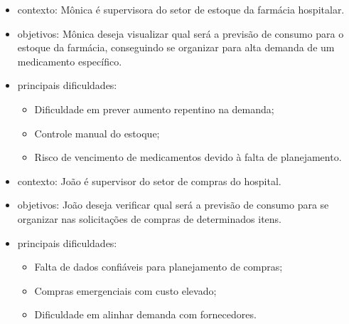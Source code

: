 \documentclass[12pt,a4paper]{article}
\begin{document}
\begin{itemize}
    \item contexto: Mônica é supervisora do setor de estoque da farmácia hospitalar.
    \item objetivos: Mônica deseja visualizar qual será a previsão de consumo para o estoque da farmácia, conseguindo se organizar para alta demanda de um medicamento específico.
    \item principais dificuldades:
    \begin{itemize}
        \item Dificuldade em prever aumento repentino na demanda;
        \item Controle manual do estoque;
        \item Risco de vencimento de medicamentos devido à falta de planejamento.
    \end{itemize}
\end{itemize}

\begin{itemize}
    \item contexto: João é supervisor do setor de compras do hospital.
    \item objetivos: João deseja verificar qual será a previsão de consumo para se organizar nas solicitações de compras de determinados itens.
    \item principais dificuldades:
    \begin{itemize}
        \item Falta de dados confiáveis para planejamento de compras;
        \item Compras emergenciais com custo elevado;
        \item Dificuldade em alinhar demanda com fornecedores.
    \end{itemize}
\end{itemize}
\end{document}
